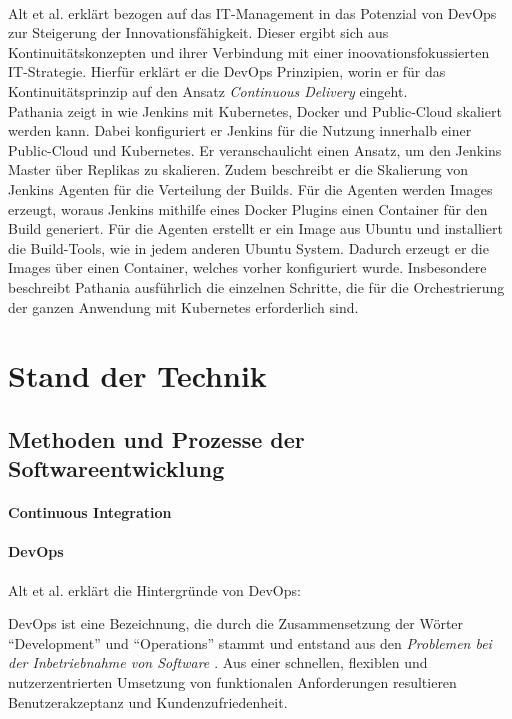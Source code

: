 \medskip
\\
Alt et al. erklärt bezogen auf das IT-Management in \cite{Alt2017} das Potenzial von DevOps zur Steigerung der Innovationsfähigkeit. Dieser ergibt sich aus Kontinuitätskonzepten und ihrer Verbindung mit einer inoovationsfokussierten IT-Strategie. Hierfür erklärt er die DevOps Prinzipien, worin er für das Kontinuitätsprinzip auf den Ansatz \emph{Continuous Delivery} eingeht. 
\medskip
\\
Pathania zeigt in \cite{Pathania2017} wie Jenkins mit Kubernetes, Docker und Public-Cloud skaliert werden kann. Dabei konfiguriert er Jenkins für die Nutzung innerhalb einer Public-Cloud und Kubernetes. Er veranschaulicht einen Ansatz, um den Jenkins Master über Replikas zu skalieren. Zudem beschreibt er die Skalierung von Jenkins Agenten für die Verteilung der Builds. Für die Agenten werden Images erzeugt, woraus Jenkins mithilfe eines Docker Plugins einen Container für den Build generiert. Für die Agenten erstellt er ein Image aus Ubuntu und installiert die Build-Tools, wie in jedem anderen Ubuntu System.
Dadurch erzeugt er die Images über einen Container, welches vorher konfiguriert wurde. Insbesondere beschreibt Pathania ausführlich die einzelnen Schritte, die für die Orchestrierung der ganzen Anwendung mit Kubernetes erforderlich sind.

\section{Stand der Technik}

\subsection{Methoden und Prozesse der Softwareentwicklung}

\paragraph{Continuous Integration}


\paragraph{DevOps}
Alt et al. erklärt die Hintergründe von DevOps:

DevOps ist eine Bezeichnung, die durch die Zusammensetzung der Wörter \enquote{Development} und \enquote{Operations} stammt und entstand aus den \emph{Problemen bei der Inbetriebnahme von Software \cite{mci/Disterer2011}}.
Aus einer schnellen, flexiblen und nutzerzentrierten Umsetzung von funktionalen Anforderungen resultieren Benutzerakzeptanz und Kundenzufriedenheit. 

